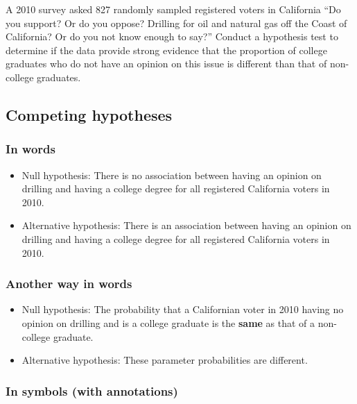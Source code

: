 \documentclass[12pt, krantz2,]{krantz}
\begin{document}
A 2010 survey asked 827 randomly sampled registered voters
in California ``Do you support? Or do you oppose? Drilling for oil and natural gas off the Coast of
California? Or do you not know enough to say?'' Conduct a hypothesis test to determine if the data
provide strong evidence that the proportion of college
graduates who do not have an opinion on this issue is
different than that of non-college graduates. \citep[Tweaked a bit from][ {[}Chapter 6{]}]{isrs2014}

\hypertarget{competing-hypotheses-2}{%
\subsection{Competing hypotheses}\label{competing-hypotheses-2}}

\hypertarget{in-words-2}{%
\subsubsection*{In words}\label{in-words-2}}


\begin{itemize}
\item
  Null hypothesis: There is no association between having an opinion on drilling and having a college degree for all registered California voters in 2010.
\item
  Alternative hypothesis: There is an association between having an opinion on drilling and having a college degree for all registered California voters in 2010.
\end{itemize}

\hypertarget{another-way-in-words}{%
\subsubsection*{Another way in words}\label{another-way-in-words}}


\begin{itemize}
\item
  Null hypothesis: The probability that a Californian voter in 2010 having no opinion on drilling and is a college graduate is the \textbf{same} as that of a non-college graduate.
\item
  Alternative hypothesis: These parameter probabilities are different.
\end{itemize}

\hypertarget{in-symbols-with-annotations-2}{%
\subsubsection*{In symbols (with annotations)}\label{in-symbols-with-annotations-2}}
\end{document}
